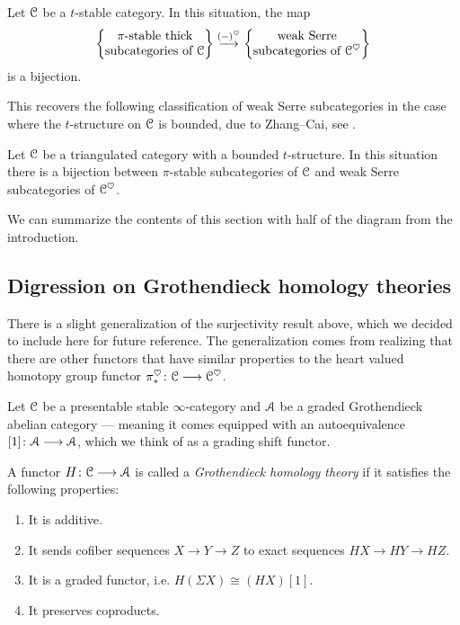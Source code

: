 \begin{proposition}
    \label{ch4:prop:classification-weak-serre}
    Let $\EuScript{C}$ be a $t$-stable category. In this situation, the map 
    \[\left\{ \begin{matrix} \pi\text{-stable thick}\\ \text{subcategories of }\EuScript{C} \end{matrix} \right\}\overset{(-)^\heartsuit}{\longrightarrow} \left\{ \begin{matrix} \text{weak Serre}\\ \text{subcategories of }\EuScript{C}^\heartsuit \end{matrix} \right\}\] 
    is a bijection. 
\end{proposition}

This recovers the following classification of weak Serre subcategories in the case where the $t$-structure on $\EuScript{C}$ is bounded, due to Zhang--Cai, see \cite{zhang-cai_2017}. 

\begin{corollary}
    \label{ch4:cor:classification-weak-serre-bounded}
    Let $\EuScript{C}$ be a triangulated category with a bounded $t$-structure. In this situation there is a bijection between $\pi$-stable subcategories of $\EuScript{C}$ and weak Serre subcategories of $\EuScript{C}^\heartsuit$.  
\end{corollary}

We can summarize the contents of this section with half of the diagram from the introduction. 

\begin{center}
\end{center}

\subsection*{Digression on Grothendieck homology theories}

There is a slight generalization of the surjectivity result above, which we decided to include here for future reference. The generalization comes from realizing that there are other functors that have similar properties to the heart valued homotopy group functor $\pi_*^\heartsuit \colon \EuScript{C}\longrightarrow \EuScript{C}^\heartsuit$. 

Let $\EuScript{C}$ be a presentable stable $\infty$-category and $\EuScript{A}$ be a graded Grothendieck abelian category --- meaning it comes equipped with an autoequivalence $[1]\colon \EuScript{A}\longrightarrow \EuScript{A}$, which we think of as a grading shift functor. 

\begin{definition}
    A functor $H\colon \EuScript{C}\longrightarrow \EuScript{A}$ is called a \emph{Grothendieck homology theory} if it satisfies the following properties:
    \begin{enumerate}
        \item It is additive.
        \item It sends cofiber sequences $X\rightarrow Y \rightarrow Z$ to exact sequences $HX\rightarrow HY\rightarrow HZ$.
        \item It is a graded functor, i.e. $H(\Sigma X) \cong (HX)[1]$.
        \item It preserves coproducts. 
    \end{enumerate}
\end{definition}

